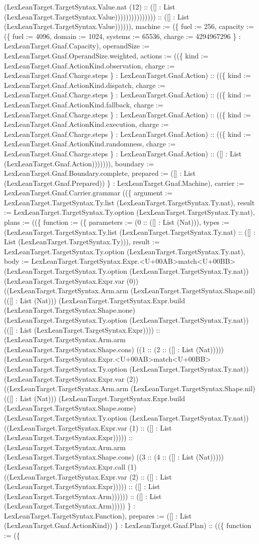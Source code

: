 \documentclass[11pt]{article}
\begin{document}
(LexLeanTarget.TargetSyntax.Value.nat (12) :: ([] : List (LexLeanTarget.TargetSyntax.Value))))))))))))))) :: ([] : List (LexLeanTarget.TargetSyntax.Value)))))), machine := (\{ fuel := 256, capacity := (\{ fuel := 4096, domain := 1024, systems := 65536, charge := 4294967296 \} : LexLeanTarget.Gnaf.Capacity), operandSize := LexLeanTarget.Gnaf.OperandSize.weighted, actions := ((\{ kind := LexLeanTarget.Gnaf.ActionKind.observation, charge := LexLeanTarget.Gnaf.Charge.steps \} : LexLeanTarget.Gnaf.Action) :: ((\{ kind := LexLeanTarget.Gnaf.ActionKind.dispatch, charge := LexLeanTarget.Gnaf.Charge.steps \} : LexLeanTarget.Gnaf.Action) :: ((\{ kind := LexLeanTarget.Gnaf.ActionKind.fallback, charge := LexLeanTarget.Gnaf.Charge.steps \} : LexLeanTarget.Gnaf.Action) :: ((\{ kind := LexLeanTarget.Gnaf.ActionKind.execution, charge := LexLeanTarget.Gnaf.Charge.steps \} : LexLeanTarget.Gnaf.Action) :: ((\{ kind := LexLeanTarget.Gnaf.ActionKind.randomness, charge := LexLeanTarget.Gnaf.Charge.steps \} : LexLeanTarget.Gnaf.Action) :: ([] : List (LexLeanTarget.Gnaf.Action))))))), boundary := LexLeanTarget.Gnaf.Boundary.complete, prepared := ([] : List (LexLeanTarget.Gnaf.Prepared)) \} : LexLeanTarget.Gnaf.Machine), carrier := LexLeanTarget.Gnaf.Carrier.grammar ((\{ argument := LexLeanTarget.TargetSyntax.Ty.list (LexLeanTarget.TargetSyntax.Ty.nat), result := LexLeanTarget.TargetSyntax.Ty.option (LexLeanTarget.TargetSyntax.Ty.nat), plans := ((\{ function := (\{ parameters := (0 :: ([] : List (Nat))), types := (LexLeanTarget.TargetSyntax.Ty.list (LexLeanTarget.TargetSyntax.Ty.nat) :: ([] : List (LexLeanTarget.TargetSyntax.Ty))), result := LexLeanTarget.TargetSyntax.Ty.option (LexLeanTarget.TargetSyntax.Ty.nat), body := LexLeanTarget.TargetSyntax.Expr.<U+00AB>match<U+00BB> (LexLeanTarget.TargetSyntax.Ty.option (LexLeanTarget.TargetSyntax.Ty.nat)) (LexLeanTarget.TargetSyntax.Expr.var (0)) ((LexLeanTarget.TargetSyntax.Arm.arm (LexLeanTarget.TargetSyntax.Shape.nil) (([] : List (Nat))) (LexLeanTarget.TargetSyntax.Expr.build (LexLeanTarget.TargetSyntax.Shape.none) (LexLeanTarget.TargetSyntax.Ty.option (LexLeanTarget.TargetSyntax.Ty.nat)) (([] : List (LexLeanTarget.TargetSyntax.Expr)))) :: (LexLeanTarget.TargetSyntax.Arm.arm (LexLeanTarget.TargetSyntax.Shape.cons) ((1 :: (2 :: ([] : List (Nat))))) (LexLeanTarget.TargetSyntax.Expr.<U+00AB>match<U+00BB> (LexLeanTarget.TargetSyntax.Ty.option (LexLeanTarget.TargetSyntax.Ty.nat)) (LexLeanTarget.TargetSyntax.Expr.var (2)) ((LexLeanTarget.TargetSyntax.Arm.arm (LexLeanTarget.TargetSyntax.Shape.nil) (([] : List (Nat))) (LexLeanTarget.TargetSyntax.Expr.build (LexLeanTarget.TargetSyntax.Shape.some) (LexLeanTarget.TargetSyntax.Ty.option (LexLeanTarget.TargetSyntax.Ty.nat)) ((LexLeanTarget.TargetSyntax.Expr.var (1) :: ([] : List (LexLeanTarget.TargetSyntax.Expr))))) :: (LexLeanTarget.TargetSyntax.Arm.arm (LexLeanTarget.TargetSyntax.Shape.cons) ((3 :: (4 :: ([] : List (Nat))))) (LexLeanTarget.TargetSyntax.Expr.call (1) ((LexLeanTarget.TargetSyntax.Expr.var (2) :: ([] : List (LexLeanTarget.TargetSyntax.Expr))))) :: ([] : List (LexLeanTarget.TargetSyntax.Arm)))))) :: ([] : List (LexLeanTarget.TargetSyntax.Arm))))) \} : LexLeanTarget.TargetSyntax.Function), prepares := ([] : List (LexLeanTarget.Gnaf.ActionKind)) \} : LexLeanTarget.Gnaf.Plan) :: ((\{ function := (\{ 
\end{document}
